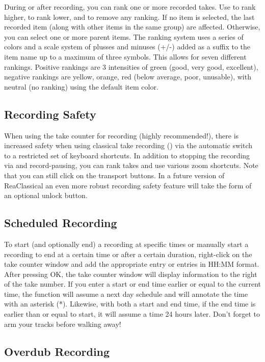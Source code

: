 \documentclass[10pt,american]{article}
\begin{document}
During or after recording, you can rank one or more recorded takes. Use
\keys{\ctrl+=} to rank higher, \keys{\ctrl+-} to rank lower, and 
to remove any ranking. If no item is selected, the last recorded item (along
with other items in the same group) are affected. Otherwise, you can select one
or more parent items. The ranking system uses a series of colors and a scale
system of plusses and minuses (+/-) added as a suffix to the item name up to a
maximum of three symbols. This allows for seven different rankings. Positive
rankings are 3 intensities of green (good, very good, excellent), negative
rankings are yellow, orange, red (below average, poor, unusable), with neutral
(no ranking) using the default item color.

\subsection{Recording Safety}

When using the take counter for recording (highly recommended!), there is
increased safety when using classical take recording () via the
automatic switch to a restricted set of keyboard shortcuts. In addition to
stopping the recording via  and record-pausing, you can rank takes and
use various zoom shortcuts. Note that you can still click on the transport
buttons. In a future version of ReaClassical an even more robust recording
safety feature will take the form of an optional unlock button.

\subsection{Scheduled Recording}

To start (and optionally end) a recording at specific times or manually start a
recording to end at a certain time or after a certain duration, right-click on
the take counter window and add the appropriate entry or entries in HH:MM
format. After pressing OK, the take counter window will display information to
the right of the take number. If you enter a start or end time earlier or equal
to the current time, the function will assume a next day schedule and will
annotate the time with an asterisk ({*}). Likewise, with both a start and end
time, if the end time is earlier than or equal to start, it will assume a time
24 hours later. Don't forget to arm your tracks before walking away!

\subsection{Overdub Recording}
\end{document}
